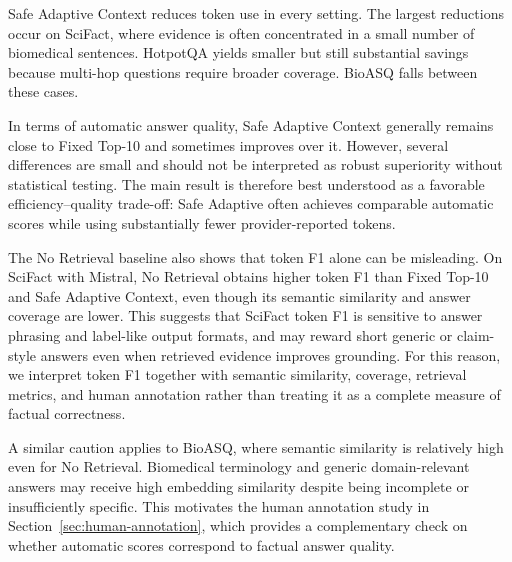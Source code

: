 \documentclass[11pt]{article}
\begin{document}
Safe Adaptive Context reduces token use in every setting. The largest reductions occur on SciFact, where evidence is often concentrated in a small number of biomedical sentences. HotpotQA yields smaller but still substantial savings because multi-hop questions require broader coverage. BioASQ falls between these cases.

In terms of automatic answer quality, Safe Adaptive Context generally remains close to Fixed Top-10 and sometimes improves over it. However, several differences are small and should not be interpreted as robust superiority without statistical testing. The main result is therefore best understood as a favorable efficiency--quality trade-off: Safe Adaptive often achieves comparable automatic scores while using substantially fewer provider-reported tokens.

The No Retrieval baseline also shows that token F1 alone can be misleading. On SciFact with Mistral, No Retrieval obtains higher token F1 than Fixed Top-10 and Safe Adaptive Context, even though its semantic similarity and answer coverage are lower. This suggests that SciFact token F1 is sensitive to answer phrasing and label-like output formats, and may reward short generic or claim-style answers even when retrieved evidence improves grounding. For this reason, we interpret token F1 together with semantic similarity, coverage, retrieval metrics, and human annotation rather than treating it as a complete measure of factual correctness.

A similar caution applies to BioASQ, where semantic similarity is relatively high even for No Retrieval. Biomedical terminology and generic domain-relevant answers may receive high embedding similarity despite being incomplete or insufficiently specific. This motivates the human annotation study in Section~\ref{sec:human-annotation}, which provides a complementary check on whether automatic scores correspond to factual answer quality.

\begin{table}[t]
\centering
\small
\caption{Safe Adaptive Context compared with the Heuristic Rules baseline.}
\label{tab:table_2_safe_adaptive_context_compared_w}
\end{table}
\end{document}
